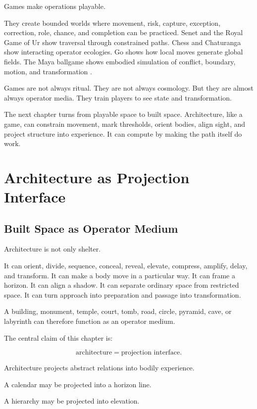 \documentclass[11pt]{book}
\begin{document}
Games make operations playable.

They create bounded worlds where movement, risk, capture, exception, correction, role, chance, and completion can be practiced. Senet and the Royal Game of Ur show traversal through constrained paths. Chess and Chaturanga show interacting operator ecologies. Go shows how local moves generate global fields. The Maya ballgame shows embodied simulation of conflict, boundary, motion, and transformation \cite{Murray1952BoardGames,Finkel2007AncientBoardGames,Murray1913Chess,Coe2011Maya}.

Games are not always ritual. They are not always cosmology. But they are almost always operator media. They train players to see state and transformation.

The next chapter turns from playable space to built space. Architecture, like a game, can constrain movement, mark thresholds, orient bodies, align sight, and project structure into experience. It can compute by making the path itself do work.

\chapter{Architecture as Projection Interface}

\section{Built Space as Operator Medium}

Architecture is not only shelter.

It can orient, divide, sequence, conceal, reveal, elevate, compress, amplify, delay, and transform. It can make a body move in a particular way. It can frame a horizon. It can align a shadow. It can separate ordinary space from restricted space. It can turn approach into preparation and passage into transformation.

A building, monument, temple, court, tomb, road, circle, pyramid, cave, or labyrinth can therefore function as an operator medium.

The central claim of this chapter is:

\[
\text{architecture} = \text{projection interface}.
\]

Architecture projects abstract relations into bodily experience.

A calendar may be projected into a horizon line.

A hierarchy may be projected into elevation.
\end{document}
